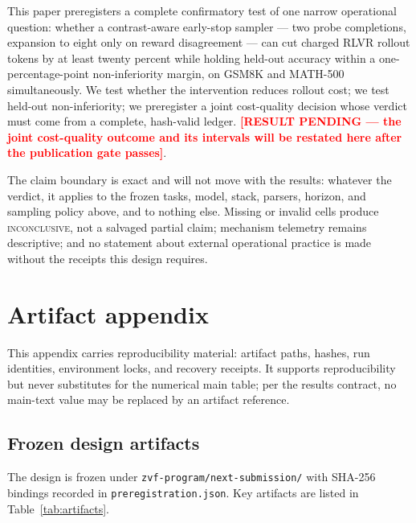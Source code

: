 \documentclass[11pt]{article}
\newcommand{\resultpending}[1]{\textcolor{red}{\textbf{[RESULT PENDING --- #1]}}}
\begin{document}
This paper preregisters a complete confirmatory test of one narrow operational question: whether a contrast-aware early-stop sampler --- two probe completions, expansion to eight only on reward disagreement --- can cut charged RLVR rollout tokens by at least twenty percent while holding held-out accuracy within a one-percentage-point non-inferiority margin, on GSM8K and MATH-500 simultaneously. We test whether the intervention reduces rollout cost; we test held-out non-inferiority; we preregister a joint cost-quality decision whose verdict must come from a complete, hash-valid ledger. \resultpending{the joint cost-quality outcome and its intervals will be restated here after the publication gate passes}.

The claim boundary is exact and will not move with the results: whatever the verdict, it applies to the frozen tasks, model, stack, parsers, horizon, and sampling policy above, and to nothing else. Missing or invalid cells produce \textsc{inconclusive}, not a salvaged partial claim; mechanism telemetry remains descriptive; and no statement about external operational practice is made without the receipts this design requires.




\appendix

\section{Artifact appendix}
\label{app:artifacts}

This appendix carries reproducibility material: artifact paths, hashes, run identities, environment locks, and recovery receipts. It supports reproducibility but never substitutes for the numerical main table; per the results contract, no main-text value may be replaced by an artifact reference.

\subsection{Frozen design artifacts}

The design is frozen under \texttt{zvf-program/next-submission/} with SHA-256 bindings recorded in \texttt{preregistration.json}. Key artifacts are listed in Table~\ref{tab:artifacts}.
\end{document}
